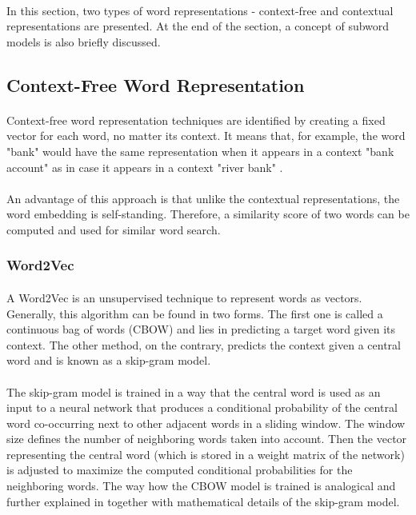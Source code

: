 \paragraph{}
In this section, two types of word representations - context-free and contextual representations are presented. At the end of the section, a concept of subword models is also briefly discussed.

\subsection{Context-Free Word Representation}\label{context_free_embedding}
\paragraph{}
Context-free word representation techniques are identified by creating a fixed vector for each word, no matter its context. It means that, for example, the word "bank" would have the same representation when it appears in a context "bank account" as in case it appears in a context "river bank" \cite{bert_ithub}.

\paragraph{}
An advantage of this approach is that unlike the contextual representations, the word embedding is self-standing. Therefore, a similarity score of two words can be computed and used for similar word search.

\subsubsection{Word2Vec}\label{w2v}
\paragraph{}
A Word2Vec \cite{word2vec} is an unsupervised technique to represent words as vectors. Generally, this algorithm can be found in two forms. The first one is called a continuous bag of words (CBOW) and lies in predicting a target word given its context. The other method, on the contrary, predicts the context given a central word and is known as a skip-gram model. 

\paragraph{}
The skip-gram model is trained in a way that the central word is used as an input to a neural network that produces a conditional probability of the central word co-occurring next to other adjacent words in a sliding window. The window size defines the number of neighboring words taken into account. Then the vector representing the central word (which is stored in a weight matrix of the network) is adjusted to maximize the computed conditional probabilities for the neighboring words. The way how the CBOW model is trained is analogical and further explained in \cite{training_word2vec} together with mathematical details of the skip-gram model.


